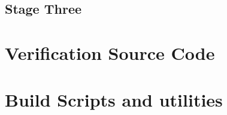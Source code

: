        \subsection{Stage Three}
        
        

    \section{Verification Source Code}
        
        
        
        
    
    \section{Build Scripts and utilities}
        
        
        

